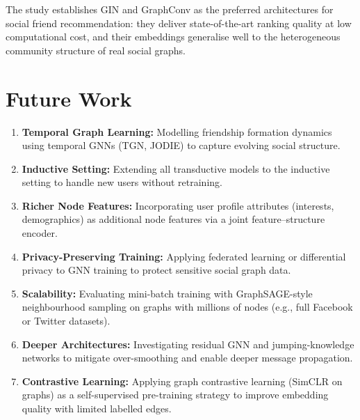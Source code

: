 \documentclass[12pt,a4paper]{article}
\begin{document}
The study establishes GIN and GraphConv as the preferred architectures for social friend recommendation: they deliver state-of-the-art ranking quality at low computational cost, and their embeddings generalise well to the heterogeneous community structure of real social graphs.

\section{Future Work}
\label{sec:future}

\begin{enumerate}
    \item \textbf{Temporal Graph Learning:} Modelling friendship formation dynamics using temporal GNNs (TGN, JODIE) to capture evolving social structure.
    \item \textbf{Inductive Setting:} Extending all transductive models to the inductive setting to handle new users without retraining.
    \item \textbf{Richer Node Features:} Incorporating user profile attributes (interests, demographics) as additional node features via a joint feature--structure encoder.
    \item \textbf{Privacy-Preserving Training:} Applying federated learning or differential privacy to GNN training to protect sensitive social graph data.
    \item \textbf{Scalability:} Evaluating mini-batch training with GraphSAGE-style neighbourhood sampling on graphs with millions of nodes (e.g., full Facebook or Twitter datasets).
    \item \textbf{Deeper Architectures:} Investigating residual GNN and jumping-knowledge networks to mitigate over-smoothing and enable deeper message propagation.
    \item \textbf{Contrastive Learning:} Applying graph contrastive learning (SimCLR on graphs) as a self-supervised pre-training strategy to improve embedding quality with limited labelled edges.
\end{enumerate}
\end{document}
